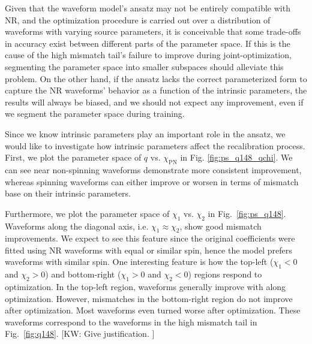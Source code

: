 \documentclass[twocolumn]{aastex631}
\newcommand{\kw}[1]{{\color{rb4}[KW: #1 ]}}
\begin{document}

Given that the waveform model's ansatz may not be entirely compatible with NR,
and the optimization procedure is carried out over a distribution of waveforms
with varying source parameters, it is conceivable that some trade-offs in
accuracy exist between different parts of the parameter space. If this is the
cause of the high mismatch tail's failure to improve during joint-optimization,
segmenting the parameter space into smaller subspaces should alleviate this
problem. On the other hand, if the ansatz lacks the correct parameterized form
to capture the NR waveforms' behavior as a function of the intrinsic parameters,
the results will always be biased, and we should not expect any improvement,
even if we segment the parameter space during training.

Since we know intrinsic parameters play an important role in the ansatz, we
would like to investigate how intrinsic parameters affect the recalibration
process. First, we plot the parameter space of $q$ vs. $\chi_{\mathrm{PN}}$ in
Fig. \ref{fig:ps_q148_qchi}. We can see near non-spinning waveforms demonstrate
more consistent improvement, whereas spinning waveforms can either improve or
worsen in terms of mismatch base on their intrinsic parameters. 

Furthermore, we plot the parameter space of $\chi_1$ vs. $\chi_2$ in
Fig.~\ref{fig:ps_q148}. Waveforms along the diagonal axis, i.e.
$\chi_1\approx\chi_2$, show good mismatch improvements. We expect to see this
feature since the original coefficients were fitted using NR waveforms with
equal or similar spin, hence the model prefers waveforms with similar spin. One
interesting feature is how the top-left ($\chi_1<0$ and $\chi_2>0$) and bottom-right ($\chi_1>0$ and $\chi_2<0$) regions respond to
optimization. In the top-left region, waveforms
generally improve with along optimization. However, mismatches in the bottom-right region do not improve after optimization. Most
waveforms even turned worse after optimization. These waveforms correspond to
the waveforms in the high mismatch tail in Fig.~\ref{fig:q148}. \kw{Give justification.}
\end{document}
